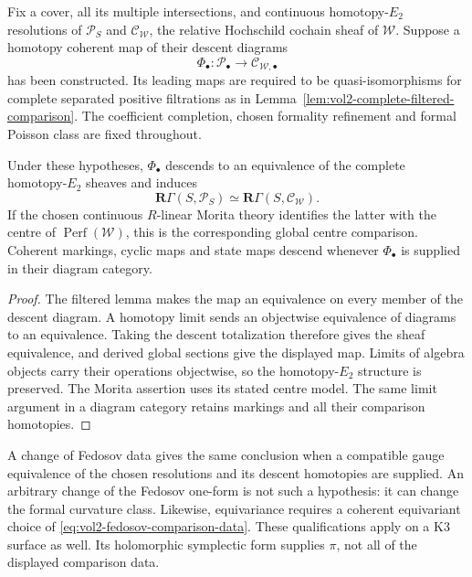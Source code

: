 Fix a cover, all its multiple intersections, and continuous
homotopy-\(E_2\) resolutions of \(\mathcal P_S\) and
\(\mathcal C_{\mathcal W}\), the relative Hochschild
cochain sheaf of \(\mathcal W\). Suppose a homotopy coherent
map of their descent diagrams
\begin{equation}\label{eq:vol2-fedosov-comparison-data}
 \Phi_\bullet:\mathcal P_\bullet\longrightarrow
                            \mathcal C_{\mathcal W,\bullet}
\end{equation}
has been constructed. Its leading maps are required to be
quasi-isomorphisms for complete separated positive
filtrations as in
Lemma~\ref{lem:vol2-complete-filtered-comparison}.
The coefficient completion, chosen formality refinement
and formal Poisson class are fixed throughout.

\begin{theorem}
\label{thm:vol2-fedosov-marked-descent}
Under these hypotheses, \(\Phi_\bullet\) descends to an
equivalence of the complete homotopy-\(E_2\) sheaves and
induces
\[
 \mathbf R\Gamma(S,\mathcal P_S)
       \simeq \mathbf R\Gamma(S,\mathcal C_{\mathcal W}).
\]
If the chosen continuous \(R\)-linear Morita theory
identifies the latter with the centre of
\(\operatorname{Perf}(\mathcal W)\), this is the corresponding
global centre comparison. Coherent markings, cyclic maps
and state maps descend whenever
\(\Phi_\bullet\) is supplied in their diagram category.
\end{theorem}
\begin{proof}
The filtered lemma makes the map an equivalence on every
member of the descent diagram. A homotopy limit sends an
objectwise equivalence of diagrams to an equivalence.
Taking the descent totalization therefore gives the sheaf
equivalence, and derived global sections give the displayed
map. Limits of algebra objects carry their operations
objectwise, so the homotopy-\(E_2\) structure is preserved.
The Morita assertion uses its stated centre model.
The same limit argument in a diagram category retains
markings and all their comparison homotopies.
\end{proof}

A change of Fedosov data gives the same conclusion when
a compatible gauge equivalence of the chosen resolutions
and its descent homotopies are supplied. An arbitrary
change of the Fedosov one-form is not such a hypothesis:
it can change the formal curvature class.
Likewise, equivariance requires a coherent equivariant
choice of \eqref{eq:vol2-fedosov-comparison-data}.
These qualifications apply on a K3 surface as well.
Its holomorphic symplectic form supplies \(\pi\), not all
of the displayed comparison data.

